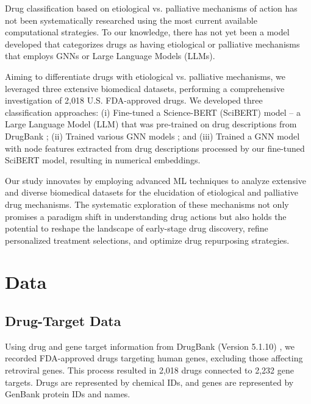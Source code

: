 \documentclass[journal,twoside,web]{ieeecolor}
\begin{document}
Drug classification based on etiological vs. palliative mechanisms of action has not been systematically researched using the most current available computational strategies.
To our knowledge, there has not yet been a model developed that categorizes drugs as having etiological or palliative mechanisms that employs GNNs or Large Language Models (LLMs).

Aiming to differentiate drugs with etiological vs. palliative mechanisms, we leveraged three extensive biomedical datasets, performing a comprehensive investigation of 2,018 U.S. FDA-approved drugs.
We developed three classification approaches:
(i) Fine-tuned a Science-BERT (SciBERT) model -- a Large Language Model (LLM) that was pre-trained \cite{beltagy2019scibert} on drug descriptions from DrugBank \cite{wishart2018drugbank,knox2024drugbank};
(ii) Trained various GNN models \cite{huang2020combining}; and
(iii) Trained a GNN model with node features extracted from drug descriptions processed by our fine-tuned SciBERT model, resulting in numerical embeddings.

Our study innovates by employing advanced ML techniques to analyze extensive and diverse biomedical datasets for the elucidation of etiological and palliative drug mechanisms.
The systematic exploration of these mechanisms not only promises a paradigm shift in understanding drug actions but also holds the potential to reshape the landscape of early-stage drug discovery, refine personalized treatment selections, and optimize drug repurposing strategies.

\section{Data}
\label{sec:materials}
\subsection{Drug-Target Data}
\label{sec:DrugBank_data}
Using drug and gene target information from DrugBank (Version 5.1.10) \cite{wishart2018drugbank}, we recorded FDA-approved drugs targeting human genes, excluding those affecting retroviral genes. This process resulted in 2,018 drugs connected to 2,232 gene targets.
Drugs are represented by chemical IDs, and genes are represented by GenBank \cite{benson2012genbank} protein IDs and names.
\end{document}
